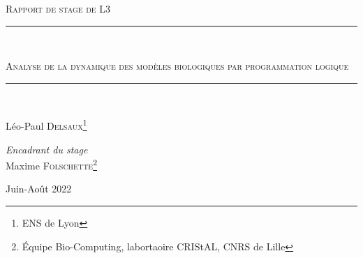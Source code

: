 \documentclass[12pt,a4paper]{article}
\newcommand{\HRule}{\rule{\linewidth}{0.5mm}}
\begin{document}
\begin{titlepage}
    \begin{center}
        \textsc{\Large Rapport de stage de L3}\\

    \vspace{2.5cm}

        \HRule\\
        {\huge\scshape Analyse de la dynamique des modèles biologiques par programmation logique\par}
        \HRule\\

    \vspace{3cm}

        \large
        Léo-Paul \textsc{Delsaux}\footnote[2]{ENS de Lyon}\\

    \vspace{1cm}

        \large
        \emph{Encadrant du stage} \\
        Maxime \textsc{Folschette}\footnote[3]{Équipe Bio-Computing, labortaoire CRIStAL, CNRS de Lille}\\

    \vfill

        {\large Juin-Août 2022}
    \end{center}
\end{titlepage}


\pagestyle{plain}%

\newpage
\tableofcontents

\newpage
\end{document}

